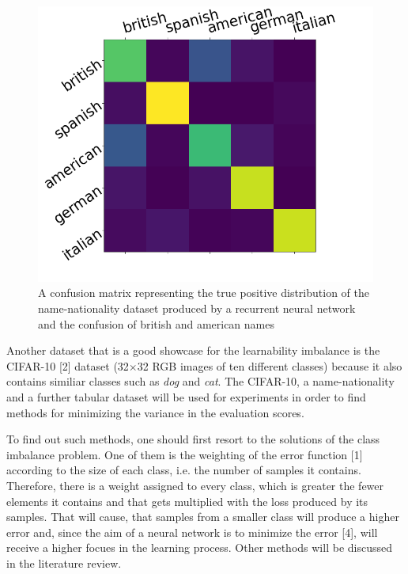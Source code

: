 \documentclass[journal]{IEEEtran}
\begin{document}
\begin{figure}[h!]
        \includegraphics[width=\linewidth]{images/Figure_1.png}
        \caption{A confusion matrix representing the true positive distribution of the name-nationality dataset produced by a recurrent neural network and the confusion of british and american names}
        \label{fig:tp_scores}
\end{figure}

Another dataset that is a good showcase for the learnability imbalance is the CIFAR-10 [2] dataset (32$\times$32 RGB images of ten different classes) because it also contains similiar classes such as \emph{dog} and \emph{cat}.
The CIFAR-10, a name-nationality and a further tabular dataset will be used for experiments in order to find methods for minimizing the variance in the evaluation scores.

To find out such methods, one should first resort to the solutions of the class imbalance problem.
One of them is the weighting of the error function [1] according to the size of each class, i.e. the number of samples it contains.
Therefore, there is a weight assigned to every class, which is greater the fewer elements it contains and that gets multiplied with the loss produced by its samples. %
That will cause, that samples from a smaller class will produce a higher error and, since the aim of a neural network is to minimize the error [4], will receive a higher focues in the learning process.
Other methods will be discussed in the literature review.
\end{document}

